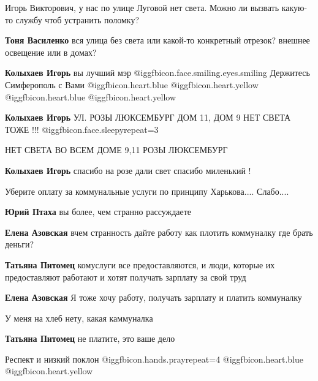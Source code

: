 \begin{itemize}

Игорь Викторович, у нас по улице Луговой нет света. Можно ли вызвать какую-то
службу чтоб устранить поломку?

\begin{itemize} %
\textbf{Тоня Василенко} вся улица без света или какой-то конкретный отрезок? внешнее освещение или в домах?

\textbf{Колыхаев Игорь} вы лучший мэр @igg{fbicon.face.smiling.eyes.smiling}  Держитесь Симферополь с Вами @igg{fbicon.heart.blue}  @igg{fbicon.heart.yellow}  @igg{fbicon.heart.blue}  @igg{fbicon.heart.yellow} 

\textbf{Колыхаев Игорь} УЛ. РОЗЫ ЛЮКСЕМБУРГ ДОМ 11, ДОМ 9 НЕТ СВЕТА ТОЖЕ !!! @igg{fbicon.face.sleepy}{repeat=3} 

НЕТ СВЕТА ВО ВСЕМ ДОМЕ 9,11 РОЗЫ ЛЮКСЕМБУРГ

\textbf{Колыхаев Игорь} спасибо на розе дали свет спасибо миленький !
\end{itemize} %


Уберите оплату за коммунальные услуги по принципу Харькова.... Слабо....

\begin{itemize} %
\textbf{Юрий Птаха} вы более, чем странно рассуждаете

\textbf{Елена Азовская} вчем странность дайте работу как плотить коммуналку где брать деньги?

\textbf{Татьяна Питомец} комуслуги все предоставляются, и люди, которые их предоставляют работают и хотят получать зарплату за свой труд

\textbf{Елена Азовская} Я тоже хочу работу, получать зарплату и платить коммуналку

У меня на хлеб нету, какая каммуналка

\textbf{Татьяна Питомец} не платите, это ваше дело

\end{itemize} %

Респект и низкий поклон  @igg{fbicon.hands.pray}{repeat=4}  @igg{fbicon.heart.blue}  @igg{fbicon.heart.yellow} 



\end{itemize}
